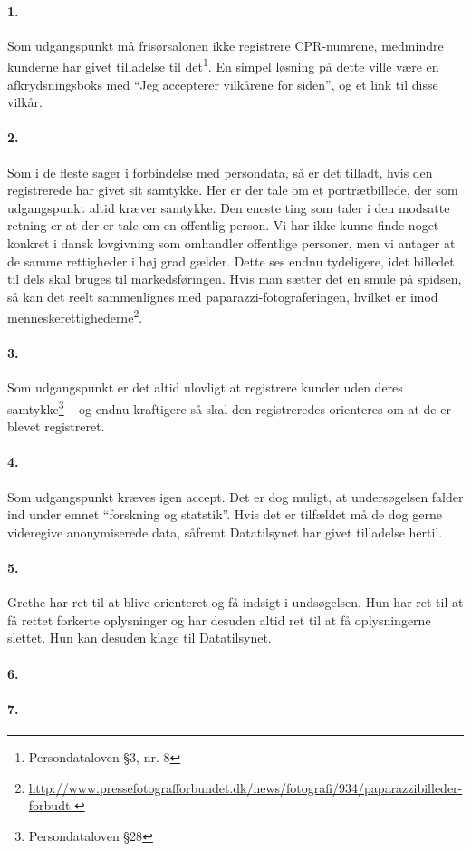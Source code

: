 



\maketitle

\tableofcontents

\thispagestyle{empty}

\paragraph{1.} Som udgangspunkt må frisørsalonen ikke registrere CPR-numrene,
medmindre kunderne har givet tilladelse til det\footnote{Persondataloven §3, nr.
8}. En simpel løsning på dette ville være en afkrydsningsboks med ``Jeg
accepterer vilkårene for siden'', og et link til disse vilkår.

\paragraph{2.} Som i de fleste sager i forbindelse med persondata, så
er det tilladt, hvis den registrerede har givet sit samtykke. Her er der
tale om et portrætbillede, der som udgangspunkt altid kræver samtykke.
Den eneste ting som taler i den modsatte retning er at der er tale om en
offentlig person. Vi har ikke kunne finde noget konkret i dansk lovgivning
som omhandler offentlige personer, men vi antager at de samme rettigheder i
høj grad gælder. Dette ses endnu tydeligere, idet billedet til dels skal
bruges til markedsføringen. Hvis man sætter det en smule på spidsen, så
kan det reelt sammenlignes med paparazzi-fotograferingen, hvilket er imod
menneskerettighederne\footnote{\url{
    http://www.pressefotografforbundet.dk/news/fotografi/934/paparazzibilleder-forbudt
}}.

\paragraph{3.} Som udgangspunkt er det altid ulovligt at registrere kunder uden
deres samtykke\footnote{Persondataloven §28} -- og endnu kraftigere så skal den
registreredes orienteres om at de er blevet registreret.

\paragraph{4.} Som udgangspunkt kræves igen accept. Det er dog muligt, at
undersøgelsen falder ind under emnet ``forskning og statstik''. Hvis det er
tilfældet må de dog gerne videregive anonymiserede data, såfremt Datatilsynet
har givet tilladelse hertil.

\paragraph{5.} Grethe har ret til at blive orienteret og få indsigt i
undsøgelsen. Hun har ret til at få rettet forkerte oplysninger og har desuden
altid ret til at få oplysningerne slettet. Hun kan desuden klage til
Datatilsynet.

\paragraph{6.}

\paragraph{7.}


